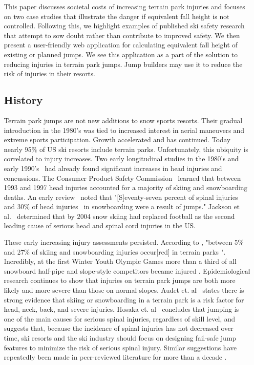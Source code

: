 \documentclass{article}
\begin{document}
This paper discusses societal costs of increasing terrain park injuries and
focuses on two case studies that illustrate the danger if equivalent fall
height is not controlled. Following this, we highlight examples of published ski safety research that attempt to sow doubt rather than contribute to improved safety. We then present a user-friendly web application for calculating equivalent fall height of existing or planned jumps. We see this application as a part of the solution to reducing injuries in terrain park jumps. Jump builders may use it to reduce the risk of injuries in their resorts.

\subsection{History}
%
Terrain park jumps are not new additions to snow sports resorts. Their gradual
introduction in the 1980's was tied to increased interest in aerial maneuvers
and extreme sports participation. Growth accelerated and has continued.  Today
nearly 95\% of US ski resorts include terrain parks. Unfortunately, this
ubiquity is correlated to injury increases.  Two early longitudinal studies  in
the 1980's and early 1990's~\cite{Deibert1998,Furrer1995} had already found
significant increases in head injuries and concussions. The Consumer Product
Safety Commission~\cite{CPSC1999} learned that between 1993 and 1997 head injuries accounted
for a majority of skiing
and snowboarding deaths. An early review~\cite{Koehle2002} noted that "[S]eventy-seven
percent of spinal injuries~\cite{Tarazi1999} and 30\% of head
injuries~\cite{Fukuda2001}
in snowboarding were a result of jumps." Jackson et al.~\cite{Jackson2004}
determined that by 2004 snow skiing had replaced football as the second leading
cause of serious head and spinal cord injuries in the US.

These early increasing injury assessments persisted. According to
\cite{Russell2014}, "between 5\% and 27\% of skiing and snowboarding injuries
occur[red] in terrain parks \cite{Bridges2003, Goulet2007,Moffat2009,
Greve2009,Brooks2010,Ruedl2013}". Incredibly, at the first Winter Youth
Olympic Games more than a third of all snowboard half-pipe and slope-style
competitors became injured \cite{Ruedl2012}. Epidemiological research
continues to show \cite{Carus2016,Audet2019a,Hosaka2020} that injuries on
terrain park jumps are both more likely and more severe than those on normal
slopes. Audet et. al~\cite{Audet2019a} states  there is strong evidence that
skiing or snowboarding in a terrain park is a risk factor for head, neck,
back, and severe injuries. Hosaka et. al~\cite{Hosaka2020} concludes that
jumping is one of the main causes for serious spinal injuries, regardless of
skill level, and suggests that, because the incidence of spinal injuries has
not decreased over time, ski resorts and the ski industry should focus on
designing fail-safe jump features to minimize the risk of serious spinal
injury.  Similar suggestions have repeatedly been made in peer-reviewed
literature for more than a decade
\cite{Hubbard2009,Swedberg2012,McNeil2012,McNeil2012a,Hubbard2015,
Levy2015,Petrone2017,Moore2018}.
\end{document}
